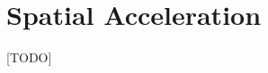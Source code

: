 \documentclass[main]{subfiles}
\begin{document}
\section{Spatial Acceleration}
\label{spatial acceleration}
[TODO]
\end{document}
